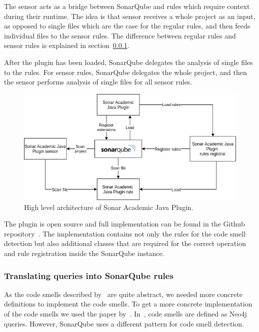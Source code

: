 The sensor acts as a bridge between SonarQube and rules which require context during their runtime.
The idea is that sensor receives a whole project as an input, as opposed to single files which are the case for the
regular rules, and then feeds individual files to the sensor rules.
The difference between regular rules and sensor rules is explained in section~\ref{subsubsec:translating-queries}.

After the plugin has been loaded, SonarQube delegates the analysis of single files to the rules.
For sensor rules, SonarQube delegates the whole project, and then the sensor performs analysis of single files for all sensor rules.

\begin{figure}[ht]
    \begin{center}
        \includegraphics[scale=0.7]{figures/architecture_diagram.png}
        \caption{High level architecture of Sonar Academic Java Plugin.}
        \label{architecture_diagram}
    \end{center}
\end{figure}

The plugin is open source and full implementation can be found in the Github repository~\cite{sonar_plugin}.
The implementation contains not only the rules for the code smell detection but also additional classes
that are required for the correct operation and rule registration inside the SonarQube instance.

\FloatBarrier

\subsubsection{Translating queries into SonarQube rules}\label{subsubsec:translating-queries}

As the code smells described by~\citeauthor{refactoring-fowler} are quite abstract, we needed
more concrete definitions to implement the code smells.
To get a more concrete implementation of the code smells we used the paper by~\citeauthor{ios_code_smell_paper}.
In~\cite{ios_code_smell_paper}, code smells are defined as Neo4j queries.
However, SonarQube uses a different pattern for code smell detection.

